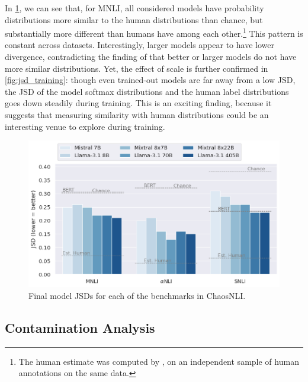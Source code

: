 In \cref{fig:jsd_all_benchmarks}, we can see that, for MNLI, all considered models have probability distributions more similar to the human distributions than chance, but substantially more different than humans have among each other.\footnote{The human estimate was computed by \citet{nie-etal-2020-learn}, on an independent sample of human annotations on the same data.}
This pattern is constant across datasets.
Interestingly, larger models appear to have lower divergence, contradicting the finding of \citet{nie-etal-2020-learn} that better or larger models do not have more similar distributions.
Yet, the effect of scale is further confirmed in \cref{fig:jsd_training}: though even trained-out models are far away from a low JSD, the JSD of the model softmax distributions and the human label distributions goes down steadily during training.
This is an exciting finding, because it suggests that measuring similarity with human distributions could be an interesting venue to explore during training.

\begin{figure}
    \centering
    \includegraphics[width=0.6\linewidth]{figures/jsd_all_benchmarks}
    \caption{Final model JSDs for each of the benchmarks in ChaosNLI.}
    \label{fig:jsd_all_benchmarks}
\end{figure}
% 

\subsection{Contamination Analysis}\label{subsec:contamination}

